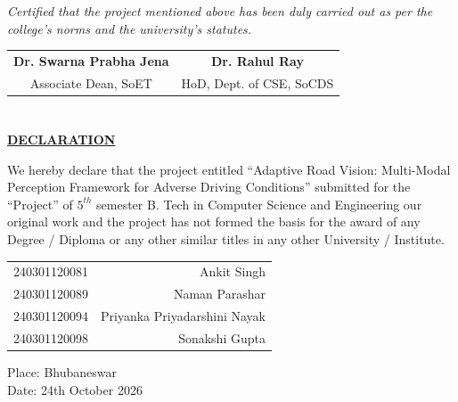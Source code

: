 \documentclass{article}
\begin{document}
\vfill

\noindent\textit{\large Certified that the project mentioned above has been duly carried out as per the college's norms and the university's statutes.}

\vfill
\vspace{0.5cm}

\noindent
\begin{tabular*}{\textwidth}{@{\extracolsep{\fill}}cc}
    \textbf{\large Dr. Swarna Prabha Jena} & \textbf{\large Dr. Rahul Ray} \\ 
    \large Associate Dean, SoET & \large HoD, Dept. of CSE, SoCDS \\
\end{tabular*}

\newpage

\vfill
\newpage
\section*{} %
\begin{center}
\underline{\LARGE \textbf{DECLARATION}}\\[1.5cm]
\end{center}
\large{We hereby declare that the project entitled “Adaptive Road Vision: Multi-Modal Perception Framework for Adverse Driving Conditions” submitted for the “Project” of $5^{th}$ semester B. Tech in Computer Science
and Engineering our original work and the project has not formed the basis for the award of any Degree / Diploma or any other similar titles in any other University / Institute.}\\[0.5cm]

\begin{flushright}
\begin{table}[h]
\begin{tabular}{lr}
240301120081 & Ankit Singh \\ 
240301120089 & Naman Parashar \\
240301120094 & Priyanka Priyadarshini Nayak \\
240301120098 & Sonakshi Gupta \\
\end{tabular}
\end{table}
\end{flushright}

\begin{flushleft}
Place: Bhubaneswar\\
Date: 24th October 2026
\end{flushleft}
\end{document}
